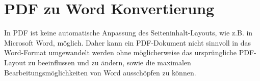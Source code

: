 \section{PDF zu Word Konvertierung}
In PDF ist keine automatische Anpassung des Seiteninhalt-Layouts, wie z.B. in Microsoft Word, möglich. Daher kann ein PDF-Dokument nicht sinnvoll in das Word-Format umgewandelt werden ohne möglicherweise das ursprüngliche PDF-Layout zu beeinflussen und zu ändern, sowie die maximalen Bearbeitungsmöglichkeiten von Word ausschöpfen zu können.